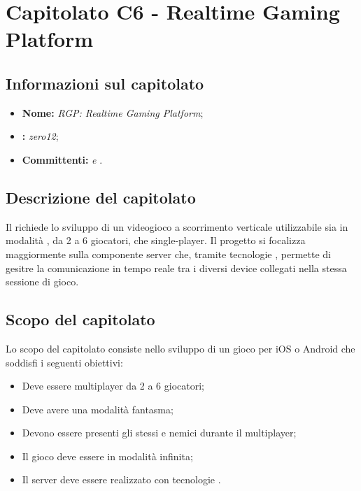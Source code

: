 \section{Capitolato C6 - Realtime Gaming Platform}
\label{C6}
\subsection{Informazioni sul capitolato}
\begin{itemize}
	\item \textbf{Nome:} \textit{RGP: Realtime Gaming Platform};
	\item \textbf{:} \textit{zero12};
	\item \textbf{Committenti:} \textit{\VT{} e \CR{}}.
\end{itemize}

\subsection{Descrizione del capitolato}
Il  richiede lo sviluppo di un videogioco a scorrimento verticale utilizzabile sia in modalità , da 2 a 6 giocatori, che single-player. Il progetto si focalizza maggiormente sulla componente server che, tramite tecnologie , permette di gesitre la comunicazione in tempo reale tra i diversi device collegati nella stessa sessione di gioco.

\subsection{Scopo del capitolato}
Lo scopo del capitolato consiste nello sviluppo di un gioco per iOS o Android che soddisfi i seguenti obiettivi:
\begin{itemize}
	\item Deve essere multiplayer da 2 a 6 giocatori;
	\item Deve avere una modalità fantasma;
	\item Devono essere presenti gli stessi  e nemici durante il multiplayer;
	\item Il gioco deve essere in modalità infinita;
	\item Il server deve essere realizzato con tecnologie .
\end{itemize}

